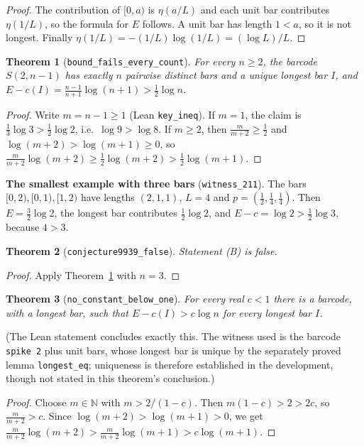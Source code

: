 \documentclass[11pt]{article}
\newtheorem{theorem}{Theorem}
\theoremstyle{definition}
\theoremstyle{remark}
\newcommand{\nml}{\eta}
\begin{document}
\begin{proof}
The contribution of $[0,a)$ is $\nml(a/L)$ and each unit bar contributes $\nml(1/L)$, so the formula
for $E$ follows. A unit bar has length $1<a$, so it is not longest. Finally
$\nml(1/L)=-(1/L)\log(1/L)=(\log L)/L$.
\end{proof}

\begin{theorem}[\texttt{bound\_fails\_every\_count}]\label{thm:main}
For every $n\ge2$, the barcode $S(2,n-1)$ has exactly $n$ pairwise distinct bars and a unique longest
bar $I$, and $E-c(I)=\frac{n-1}{n+1}\log(n+1)>\frac12\log n$.
\end{theorem}

\begin{proof}
Write $m=n-1\ge1$ (Lean \texttt{key\_ineq}). If $m=1$, the claim is $\frac13\log3>\frac12\log2$,
i.e.\ $\log 9>\log 8$. If $m\ge2$, then $\frac{m}{m+2}\ge\frac12$ and $\log(m+2)>\log(m+1)\ge0$, so
$\frac{m}{m+2}\log(m+2)\ge\frac12\log(m+2)>\frac12\log(m+1)$.
\end{proof}

\textbf{The smallest example with three bars} (\texttt{witness\_211}). The bars $[0,2),[0,1),[1,2)$
have lengths $(2,1,1)$, $L=4$ and $p=(\frac12,\frac14,\frac14)$. Then $E=\frac32\log2$, the longest
bar contributes $\frac12\log2$, and $E-c=\log2>\frac12\log3$, because $4>3$.

\begin{theorem}[\texttt{conjecture9939\_false}]
Statement (B) is false.
\end{theorem}

\begin{proof}
Apply Theorem~\ref{thm:main} with $n=3$.
\end{proof}

\begin{theorem}[\texttt{no\_constant\_below\_one}]\label{thm:const}
For every real $c<1$ there is a barcode, with a longest bar, such that $E-c(I)>c\log n$ for
every longest bar $I$.
\end{theorem}
(The Lean statement concludes exactly this. The witness used is the barcode \texttt{spike 2}
plus unit bars, whose longest bar is unique by the separately proved lemma
\texttt{longest\_eq}; uniqueness is therefore established in the development, though not
stated in this theorem's conclusion.)

\begin{proof}
Choose $m\in\mathbb{N}$ with $m>2/(1-c)$. Then $m(1-c)>2>2c$, so $\frac{m}{m+2}>c$. Since
$\log(m+2)>\log(m+1)>0$, we get $\frac{m}{m+2}\log(m+2)>\frac{m}{m+2}\log(m+1)>c\log(m+1)$.
\end{proof}
\end{document}
